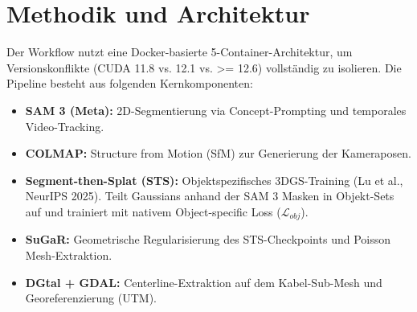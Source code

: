 \documentclass[12pt,a4paper]{article}
\begin{document}
\section{Methodik und Architektur}
Der Workflow nutzt eine Docker-basierte 5-Container-Architektur, um Versionskonflikte (CUDA 11.8 vs. 12.1 vs. >= 12.6) vollständig zu isolieren. Die Pipeline besteht aus folgenden Kernkomponenten:
\begin{itemize}[noitemsep]
    \item \textbf{SAM 3 (Meta):} 2D-Segmentierung via Concept-Prompting und temporales Video-Tracking.
    \item \textbf{COLMAP:} Structure from Motion (SfM) zur Generierung der Kameraposen.
    \item \textbf{Segment-then-Splat (STS):} Objektspezifisches 3DGS-Training (Lu et al., NeurIPS 2025). Teilt Gaussians anhand der SAM 3 Masken in Objekt-Sets auf und trainiert mit nativem Object-specific Loss ($\mathcal{L}_{obj}$).
    \item \textbf{SuGaR:} Geometrische Regularisierung des STS-Checkpoints und Poisson Mesh-Extraktion.
    \item \textbf{DGtal + GDAL:} Centerline-Extraktion auf dem Kabel-Sub-Mesh und Georeferenzierung (UTM).
\end{itemize}
\end{document}
